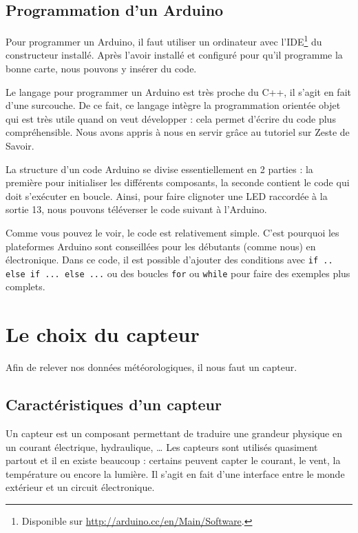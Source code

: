 \subsection{Programmation d'un Arduino}

Pour programmer un Arduino, il faut utiliser un ordinateur avec l'IDE\footnote{Disponible sur \url{http://arduino.cc/en/Main/Software}.} du constructeur installé. Après l'avoir installé et configuré pour qu'il programme la bonne carte, nous pouvons y insérer du code.

Le langage pour programmer un Arduino est très proche du C++, il s'agit en fait d'une surcouche. De ce fait, ce langage intègre la programmation orientée objet qui est très utile quand on veut développer : cela permet d'écrire du code plus compréhensible. Nous avons appris à nous en servir grâce au tutoriel \cite{tuto-arduino} sur Zeste de Savoir.

La structure d'un code Arduino se divise essentiellement en 2 parties : la première pour initialiser les différents composants, la seconde contient le code qui doit s'exécuter en boucle. Ainsi, pour faire clignoter une LED raccordée à la sortie 13, nous pouvons téléverser le code suivant à l'Arduino.


Comme vous pouvez le voir, le code est relativement simple. C'est pourquoi les plateformes Arduino sont conseillées pour les débutants (comme nous) en électronique. Dans ce code, il est possible d'ajouter des conditions avec \verb-if .. else if ... else ...- ou des boucles \verb-for- ou \verb-while- pour faire des exemples plus complets.

\section{Le choix du capteur}

Afin de relever nos données météorologiques, il nous faut un capteur.

\subsection{Caractéristiques d'un capteur}

Un capteur est un composant permettant de traduire une grandeur physique en un courant électrique, hydraulique, \dots{} Les capteurs sont utilisés quasiment partout et il en existe beaucoup : certains peuvent capter le courant, le vent, la température ou encore la lumière. Il s'agit en fait d'une interface entre le monde extérieur et un circuit électronique.

